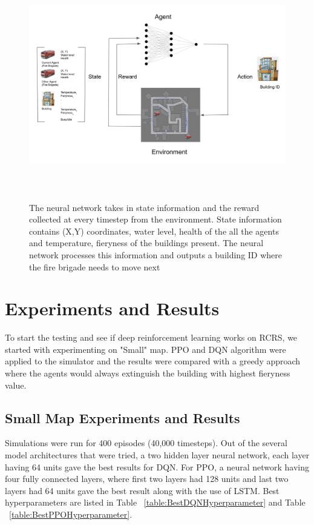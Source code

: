\documentclass[12pt]{report}
\begin{document}
\begin{figure}[!h]
    \centering
    \includegraphics[height=10cm, width=17cm]{23}
    \caption{The neural network takes in state information and the reward collected at every timestep from the environment. State information contains (X,Y) coordinates, water level, health of the all the agents and temperature, fieryness of the buildings present. The neural network processes this information and outputs a building ID where the fire brigade needs to move next}
    \label{fig:23}
\end{figure}

\section{Experiments and Results} \label{Experiments}

To start the testing and see if deep reinforcement learning works on RCRS, we started with experimenting on "Small" map. PPO and DQN algorithm were applied to the simulator and the results were compared with a greedy approach where the agents would always extinguish the building with highest fieryness value. 

\subsection{Small Map Experiments and Results}

Simulations were run for 400 episodes (40,000 timesteps). Out of the several model architectures that were tried, a two hidden layer neural network, each layer having 64 units gave the best results for DQN. For PPO, a neural network having four fully connected layers, where first two layers had 128 units and last two layers had 64 units gave the best result along with the use of LSTM. Best hyperparameters are listed in Table ~\ref{table:BestDQNHyperparameter}
and Table ~\ref{table:BestPPOHyperparameter}. 
\end{document}
